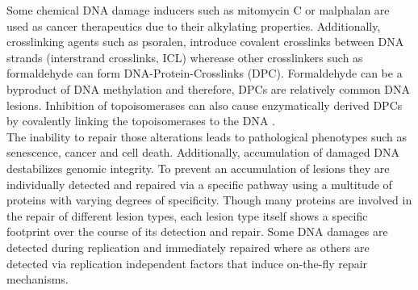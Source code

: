 Some chemical DNA damage inducers such as mitomycin C or malphalan are used as cancer therapeutics due to their alkylating properties. Additionally, crosslinking agents such as psoralen, introduce covalent crosslinks between DNA strands (interstrand crosslinks, ICL) \citep{Ciccia.2010} wherease other crosslinkers such as formaldehyde can form DNA-Protein-Crosslinks (DPC). Formaldehyde can be a byproduct of DNA methylation and therefore, DPCs are relatively common DNA lesions. Inhibition of topoisomerases can also cause enzymatically derived DPCs by covalently linking the topoisomerases to the DNA \citep{KlagesMundt.2017}.\\
The inability to repair those alterations leads to pathological phenotypes such as senescence, cancer and cell death. Additionally, accumulation of damaged DNA destabilizes genomic integrity. To prevent an accumulation of lesions they are individually detected and repaired via a specific pathway using a multitude of proteins with varying degrees of specificity. Though many proteins are involved in the repair of different lesion types, each lesion type itself shows a specific footprint over the course of its detection and repair. Some DNA damages are detected during replication and immediately repaired where as others are detected via replication independent factors that induce on-the-fly repair mechanisms. 
\\
\\
